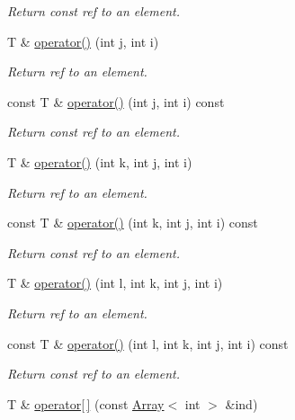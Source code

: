 \begin{DoxyCompactItemize}
\begin{DoxyCompactList}\small\item\em Return const ref to an element. \end{DoxyCompactList}\item 
T \& \mbox{\hyperlink{classADAT_1_1ArrayNd_a935f9f5199e47612b81056ac7b654c24}{operator()}} (int j, int i)
\begin{DoxyCompactList}\small\item\em Return ref to an element. \end{DoxyCompactList}\item 
const T \& \mbox{\hyperlink{classADAT_1_1ArrayNd_a476aa275f16078c90cb745312f344194}{operator()}} (int j, int i) const
\begin{DoxyCompactList}\small\item\em Return const ref to an element. \end{DoxyCompactList}\item 
T \& \mbox{\hyperlink{classADAT_1_1ArrayNd_a8c15c0d70203e59f5f746350eb6262a9}{operator()}} (int k, int j, int i)
\begin{DoxyCompactList}\small\item\em Return ref to an element. \end{DoxyCompactList}\item 
const T \& \mbox{\hyperlink{classADAT_1_1ArrayNd_a1452ab01ffb2824ebcfa50ebbcdd7b8a}{operator()}} (int k, int j, int i) const
\begin{DoxyCompactList}\small\item\em Return const ref to an element. \end{DoxyCompactList}\item 
T \& \mbox{\hyperlink{classADAT_1_1ArrayNd_a0d3dfd90a9e68964948dbccb48b18f1d}{operator()}} (int l, int k, int j, int i)
\begin{DoxyCompactList}\small\item\em Return ref to an element. \end{DoxyCompactList}\item 
const T \& \mbox{\hyperlink{classADAT_1_1ArrayNd_aa2f8e4f6fa9a05745538791ba4f70aff}{operator()}} (int l, int k, int j, int i) const
\begin{DoxyCompactList}\small\item\em Return const ref to an element. \end{DoxyCompactList}\item 
T \& \mbox{\hyperlink{classADAT_1_1ArrayNd_a5689e9a64be5914877dc3882cc68a283}{operator\mbox{[}$\,$\mbox{]}}} (const \mbox{\hyperlink{classXMLArray_1_1Array}{Array}}$<$ int $>$ \&ind)

\end{DoxyCompactItemize}
